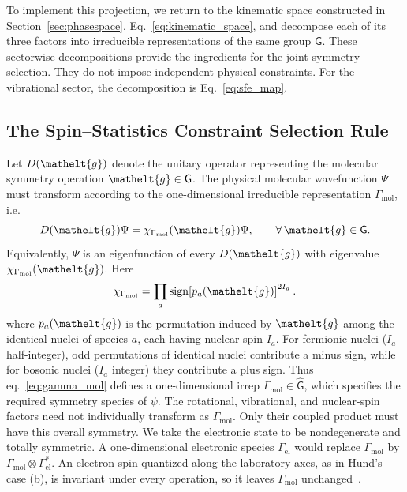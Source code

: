 \documentclass[
  reprint,
  aps,
  prx,
  superscriptaddress,
  amsmath,
  amssymb,
  longbibliography
]{revtex4-2}
\newcommand{\eltfont}[1]{{\let\sigma\eltsigma\mathelt{#1}}}
\newcommand{\grp}[1]{\mathsf{#1}}
\newcommand{\elt}[1]{\eltfont{#1}}
\newcommand{\gel}{\elt{g}}             %
\providecommand{\Gmol}{\Gamma_{\mathrm{mol}}}
\begin{document}
To implement this projection, we return to the kinematic space constructed in Section~\ref{sec:phasespace}, Eq.~\eqref{eq:kinematic_space}, and decompose each of its three factors into irreducible representations of the same group $\grp{G}$. These sectorwise decompositions provide the ingredients for the joint symmetry selection. They do not impose independent physical constraints. For the vibrational sector, the decomposition is Eq.~\eqref{eq:sfe_map}.






\subsection{The Spin--Statistics Constraint Selection Rule}
\label{sec:constraint}
Let \(D(\gel)\) denote the unitary operator representing the molecular
symmetry operation \(\gel\in\grp{G}\). The physical molecular wavefunction \(\Psi\) must transform according to the one-dimensional irreducible representation \(\Gmol\), i.e.
\begin{equation}
    D(\gel)\Psi
    =
    \chi_{\Gmol}(\gel)\Psi,
    \qquad \forall\,\gel\in\grp{G}.
    \label{eq:psi_transform}
\end{equation}
Equivalently, \(\Psi\) is an eigenfunction of every \(D(\gel)\) with
eigenvalue \(\chi_{\Gmol}(\gel)\). Here
\begin{align}
    \chi_{\Gmol}=\prod_a\operatorname{sign}\!\left[p_a(\gel)\right]^{2I_a}.
    \label{eq:gamma_mol}
\end{align}
where \(p_a(\gel)\) is the permutation induced by $\gel$ among the identical nuclei of species \(a\), each having nuclear spin \(I_a\). For fermionic nuclei ($I_a$ half-integer), odd permutations of identical nuclei contribute a minus sign, while for bosonic nuclei ($I_a$ integer) they contribute a plus sign. Thus eq.~\eqref{eq:gamma_mol} defines a one-dimensional irrep \(\Gmol\in\widehat{\grp{G}}\), which specifies the required symmetry species of $\psi$. The rotational, vibrational, and nuclear-spin factors need not individually transform as $\Gmol$. Only their coupled product must have this overall symmetry. We take the electronic state to be nondegenerate and totally symmetric. A one-dimensional electronic species $\Gamma_{\mathrm{el}}$ would replace $\Gmol$ by $\Gmol\otimes\Gamma_{\mathrm{el}}^{*}$. An electron spin quantized along the laboratory axes, as in Hund's case (b), is invariant under every operation, so it leaves $\Gmol$ unchanged~\cite{Hougen1963, BunkerJensen2006}.
\end{document}
